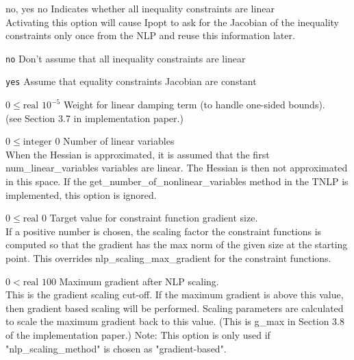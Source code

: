 %
{\ttfamily no, yes}%
{no}%
{Indicates whether all inequality constraints are linear\\
Activating this option will cause Ipopt to ask for the Jacobian of the inequality constraints only once from the NLP and reuse this information later.}%
{\begin{list}{}{
\setlength{\parsep}{0em}
\setlength{\leftmargin}{5ex}
\setlength{\labelwidth}{2ex}
\setlength{\itemindent}{0ex}
\setlength{\topsep}{0pt}}
\item[\texttt{no}] Don't assume that all inequality constraints are linear
\item[\texttt{yes}] Assume that equality constraints Jacobian are constant
\end{list}
}

%
{$0\leq\textrm{real}$}%
{$10^{- 5}$}%
{Weight for linear damping term (to handle one-sided bounds).\\
(see Section 3.7 in implementation paper.)}%
{}

%
{$0\leq\textrm{integer}$}%
{$0$}%
{Number of linear variables\\
When the Hessian is approximated, it is assumed that the first num\_linear\_variables variables are linear.  The Hessian is then not approximated in this space.  If the get\_number\_of\_nonlinear\_variables method in the TNLP is implemented, this option is ignored.}%
{}

%
{$0\leq\textrm{real}$}%
{$0$}%
{Target value for constraint function gradient size.\\
If a positive number is chosen, the scaling factor the constraint functions is computed so that the gradient has the max norm of the given size at the starting point.  This overrides nlp\_scaling\_max\_gradient for the constraint functions.}%
{}

%
{$0<\textrm{real}$}%
{$100$}%
{Maximum gradient after NLP scaling.\\
This is the gradient scaling cut-off. If the maximum gradient is above this value, then gradient based scaling will be performed. Scaling parameters are calculated to scale the maximum gradient back to this value. (This is g\_max in Section 3.8 of the implementation paper.) Note: This option is only used if "nlp\_scaling\_method" is chosen as "gradient-based".}%
{}


